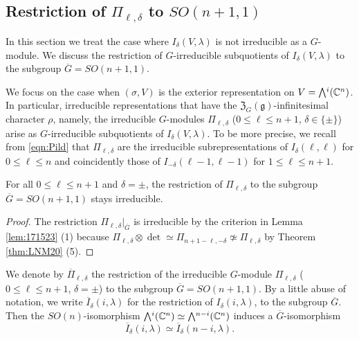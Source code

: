 \subsection{Restriction of $\Pi_{\ell,\delta}$
 to $SO(n+1,1)$}
\label{subsec:PiSO}
In this section 
 we treat the case 
 where $I_{\delta}(V, \lambda)$ is not irreducible
 as a $G$-module.  
We discuss the restriction of $G$-irreducible subquotients
 of $I_{\delta}(V, \lambda)$
 to the subgroup $\overline G=SO(n+1,1)$.  



We focus on the case 
 when $(\sigma,V)$ is the exterior representation 
 on $V=\Exterior^i({\mathbb{C}}^{n})$.  
In particular,
 irreducible representations 
 that have
 the ${\mathfrak{Z}}_G({\mathfrak{g}})$-infinitesimal character $\rho$,  
 namely,
 the irreducible $G$-modules $\Pi_{\ell,\delta}$
 ($0 \le \ell \le n+1$, $\delta \in \{\pm\}$) arise as 
 $G$-irreducible subquotients
 of $I_{\delta}(V, \lambda)$.  
To be more precise,
 we recall from \eqref{eqn:Pild}
 that $\Pi_{\ell,\delta}$
 are the irreducible subrepresentations
 of $I_{\delta}(\ell,\ell)$
 for $0 \le \ell \le n$
 and coincidently those of $I_{-\delta}(\ell-1,\ell-1)$
 for $1 \le \ell \le n+1$.  
\begin{lemma}
\label{lem:Pilso}
For all $0 \le \ell \le n+1$
 and $\delta=\pm$, 
 the restriction of $\Pi_{\ell, \delta}$
 to the subgroup $\overline G = SO(n+1,1)$ stays irreducible.  
\end{lemma}
\begin{proof}
The restriction $\Pi_{\ell, \delta}|_{\overline G}$ is 
irreducible by the criterion in Lemma \ref{lem:171523} (1)
 because $\Pi_{\ell,\delta} \otimes \det \simeq \Pi_{n+1-\ell,-\delta}
\not \simeq \Pi_{\ell,\delta}$
 by Theorem \ref{thm:LNM20} (5).  
\end{proof}



We denote by $\overline{\Pi}_{\ell,\delta}$
 the restriction of the irreducible $G$-module ${\Pi}_{\ell,\delta}$
 ($0 \le \ell \le n+1$, $\delta=\pm$)
 to the subgroup ${\overline G} = SO(n+1,1)$.  
By a little abuse of notation,
 we write $\overline I _{\delta}(i, \lambda)$
 for the restriction of $I _{\delta}(i, \lambda)$,  
 to the subgroup $\overline G$.  
Then the $SO(n)$-isomorphism
 $\Exterior^i({\mathbb{C}}^n) \simeq \Exterior^{n-i}({\mathbb{C}}^n)$
 induces a $\overline G$-isomorphism
\[
   \overline I _{\delta}(i, \lambda)
   \simeq
   \overline I _{\delta}(n-i, \lambda).  
\]


